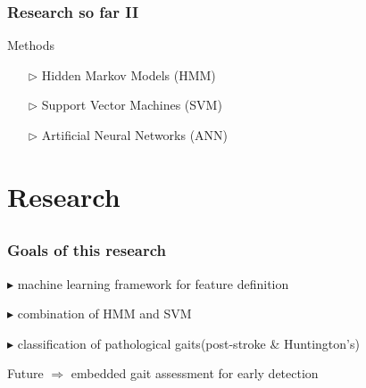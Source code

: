 \documentclass[aspectratio=43]{beamer} 	%
\begin{document}
\begin {frame}
\frametitle {Research so far {\rmfamily II}}

\begin{block}{Methods}
\begin{itemize}
\item []
\item [$\triangleright$] Hidden Markov Models (HMM)
\item []
\item [$\triangleright$] Support Vector Machines (SVM)
\item []
\item [$\triangleright$] Artificial Neural Networks (ANN)
\item []
\end{itemize}
\end{block}

\end {frame}




















\section{Research}

\subsection*{}
\begin{frame}
\frametitle {Goals of this research}

\begin{block}
{$\blacktriangleright$ machine learning framework for feature definition}
\end{block}

\begin{block}
{$\blacktriangleright$ combination of HMM and SVM}
\end{block}

\begin{block}
{$\blacktriangleright$ classification of pathological gaits\newline (post-stroke \& Huntington's)}
\end{block}


\begin{block}
{Future \newline $\Rightarrow$ embedded gait assessment for early detection}
\end{block}

\end{frame}
\end{document}
